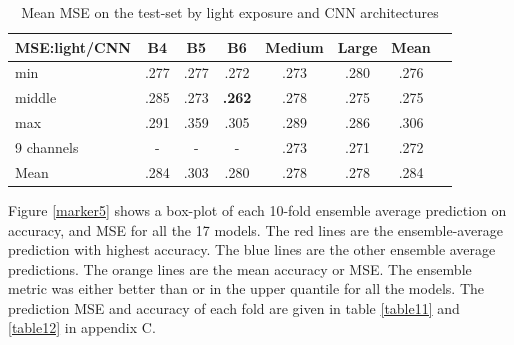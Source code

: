 \documentclass[10pt,letterpaper]{article}
\begin{document}
\begin{table}[hbt!]
\caption{Mean MSE on the test-set by light exposure and CNN architectures}
\begin{tabular}{ |l|c|c|c|c|c|c|c| }\hline
    MSE:light/CNN & B4& B5   & B6      & Medium & Large & Mean \\ \hline
    min        & .277 & .277 & .272      & .273 & .280  & .276 \\ 
    middle     & .285 & .273 & {\bf.262} & .278 & .275  & .275 \\ 
    max        & .291 & .359 & .305      & .289 & .286  & .306 \\ 
    9 channels & -    & -    & -         & .273 & .271  & .272 \\ \hline
    Mean       & .284 & .303 & .280      & .278 & .278  & .284 \\ \hline
\end{tabular}
\label{table5}
\end{table}
Figure \ref{marker5} shows a box-plot of each 10-fold ensemble average prediction on accuracy, and MSE for all the 17 models. 
The red lines are the ensemble-average prediction with highest accuracy.
The blue lines are the other ensemble average predictions.
The orange lines are the mean accuracy or MSE. 
The ensemble metric was either better than or in the upper quantile for all the models.
The prediction MSE and accuracy of each fold are given in table \ref{table11} and \ref{table12} in appendix C.
\end{document}
